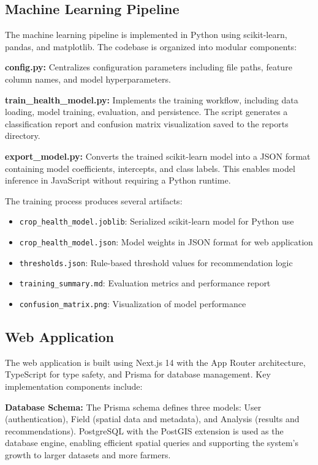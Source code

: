 \documentclass[journal]{IEEEtran}
\begin{document}
\subsection{Machine Learning Pipeline}

The machine learning pipeline is implemented in Python using scikit-learn, pandas, and matplotlib. The codebase is organized into modular components:

\textbf{config.py:} Centralizes configuration parameters including file paths, feature column names, and model hyperparameters.

\textbf{train\_health\_model.py:} Implements the training workflow, including data loading, model training, evaluation, and persistence. The script generates a classification report and confusion matrix visualization saved to the reports directory.

\textbf{export\_model.py:} Converts the trained scikit-learn model into a JSON format containing model coefficients, intercepts, and class labels. This enables model inference in JavaScript without requiring a Python runtime.

The training process produces several artifacts:
\begin{itemize}
\item \texttt{crop\_health\_model.joblib}: Serialized scikit-learn model for Python use
\item \texttt{crop\_health\_model.json}: Model weights in JSON format for web application
\item \texttt{thresholds.json}: Rule-based threshold values for recommendation logic
\item \texttt{training\_summary.md}: Evaluation metrics and performance report
\item \texttt{confusion\_matrix.png}: Visualization of model performance
\end{itemize}

\subsection{Web Application}

The web application is built using Next.js 14 with the App Router architecture, TypeScript for type safety, and Prisma for database management. Key implementation components include:

\textbf{Database Schema:} The Prisma schema defines three models: User (authentication), Field (spatial data and metadata), and Analysis (results and recommendations). PostgreSQL with the PostGIS extension is used as the database engine, enabling efficient spatial queries and supporting the system's growth to larger datasets and more farmers.
\end{document}

